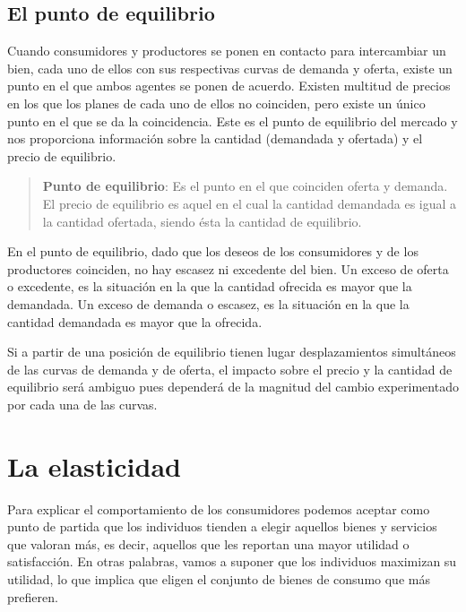 \documentclass[
]{krantz}
\begin{document}
\hypertarget{el-punto-de-equilibrio}{%
\section{El punto de equilibrio}\label{el-punto-de-equilibrio}}

Cuando consumidores y productores se ponen en contacto para intercambiar un bien, cada uno de ellos con sus respectivas curvas de demanda y oferta, existe un punto en el que ambos agentes se ponen de acuerdo. Existen multitud de precios en los que los planes de cada uno de ellos no coinciden, pero existe un único punto en el que se da la coincidencia. Este es el punto de equilibrio del mercado y nos proporciona información sobre la cantidad (demandada y ofertada) y el precio de equilibrio.

\begin{quote}
\textbf{Punto de equilibrio}:
Es el punto en el que coinciden oferta y demanda. El precio de equilibrio es aquel en el cual la cantidad demandada es igual a la cantidad ofertada, siendo ésta la cantidad de equilibrio.
\end{quote}

En el punto de equilibrio, dado que los deseos de los consumidores y de los productores coinciden, no hay escasez ni excedente del bien.
Un exceso de oferta o excedente, es la situación en la que la cantidad ofrecida es mayor que la demandada.
Un exceso de demanda o escasez, es la situación en la que la cantidad demandada es mayor que la ofrecida.

Si a partir de una posición de equilibrio tienen lugar desplazamientos simultáneos de las curvas de demanda y de oferta, el impacto sobre el precio y la cantidad de equilibrio será ambiguo pues dependerá de la magnitud del cambio experimentado por cada una de las curvas.

\hypertarget{la-elasticidad}{%
\chapter{La elasticidad}\label{la-elasticidad}}

Para explicar el comportamiento de los consumidores podemos aceptar como punto de partida que los individuos tienden a elegir aquellos bienes y servicios que valoran más, es decir, aquellos que les reportan una mayor utilidad o satisfacción. En otras palabras, vamos a suponer que los individuos maximizan su utilidad, lo que implica que eligen el conjunto de bienes de consumo que más prefieren.
\end{document}
